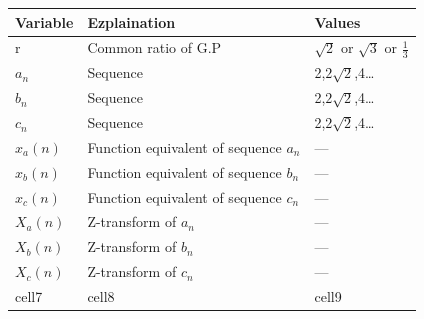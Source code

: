 \documentclass[journal,12pt,twocolumn]{IEEEtran}
\theoremstyle{remark}
\begin{document}
\begin{center}
    \begin{tabular}{ | m{3cm} | m{3cm} | m{3cm} | }
    \hline
    Variable & Ezplaination & Values \\
    \hline
    r & Common ratio of G.P & $\sqrt{2}$ or $\sqrt{3}$ or $\frac{1}{3}$ \\
    \hline
    $a_n$ & Sequence & 2,$2\sqrt{2}$,4\dots \\ 
    \hline
    $b_n$ & Sequence & 2,$2\sqrt{2}$,4\dots \\ 
    \hline
    $c_n$ & Sequence & 2,$2\sqrt{2}$,4\dots \\ 
    \hline
    $x_a(n)$ & Function equivalent of sequence $a_n$ & --- \\
    \hline 
    $x_b(n)$ & Function equivalent of sequence $b_n$ & --- \\
    \hline 
    $x_c(n)$ & Function equivalent of sequence $c_n$ & --- \\
    \hline 
    $X_a(n)$ & Z-transform of $a_n$ & --- \\
    \hline 
    $X_b(n)$ & Z-transform of $b_n$ & --- \\
    \hline 
    $X_c(n)$ & Z-transform of $c_n$ & --- \\
    \hline 
    cell7 & cell8 & cell9 \\
    \hline
    \end{tabular}
\end{center}
\end{document}
